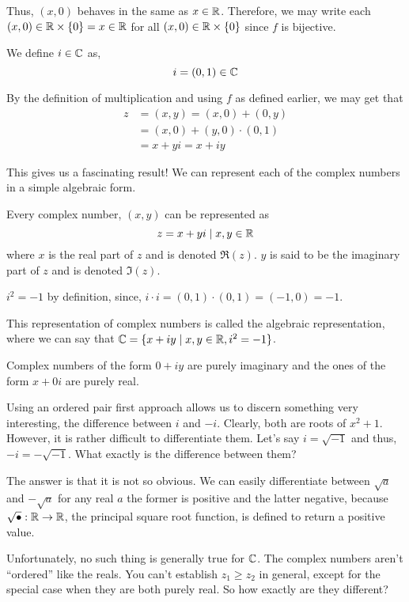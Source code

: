 Thus, \((x, 0)\) behaves in the same as \(x \in \mathbb R\). Therefore, we may write each \((x, 0) \in 
\mathbb R \times \{0\} = x \in \mathbb R\) for all \((x,0) \in \mathbb R \times \left\{0\right\}\) since \(f\) is bijective.

\begin{definition}
    We define \(i \in \mathbb C\) as, 
    \[i = (0, 1) \in \mathbb C\]
\end{definition}

By the definition of multiplication and using \(f\) as defined earlier, we may get that
\begin{align*}
    z &= (x, y) = (x, 0) + (0, y)  \\ 
    &= (x, 0) + (y, 0) \cdot (0,1) \\
    &= x + yi = x + iy
\end{align*}

This gives us a fascinating result! We can represent each of the complex numbers in a simple
algebraic form.

\begin{lemma}
    Every complex number, \((x, y)\) can be represented as 
    \[
        z = x + yi \mid x, y \in \mathbb R\]
    where \(x\) is the real part of \(z\) and is denoted \(\Re(z)\). \(y\) is said
    to be the imaginary part of \(z\) and is denoted \(\Im(z)\).
\end{lemma}

\(i^2 = -1\) by definition, since, \(i \cdot i = (0,1) \cdot (0,1) = (-1,0) = -1\).

This representation of complex numbers is called the algebraic representation, where we can
say that \(\mathbb C = \{x + iy \mid x, y \in \mathbb R, i^2 = -1\}\). 

Complex numbers of the form \(0 + iy\) are purely imaginary and the ones of the form \(x + 0i\)
are purely real. 

Using an ordered pair first approach allows us to discern something very interesting, the difference
between \(i\) and \(-i\). Clearly, both are roots of \(x^2 + 1\). However, it is rather
difficult to differentiate them. Let's say \(i = \sqrt{-1}\) and thus, \(-i = -\sqrt{-1}\).
What exactly is the difference between them?

The answer is that it is not so obvious. We can easily differentiate between 
\(\sqrt{a}\) and \(-\sqrt{a}\) for any real \(a\) the former is positive and the latter
negative, because \(\sqrt{\bullet} : \mathbb R \to \mathbb R \), the principal square root function,
is defined to return a positive value. 

Unfortunately, no such thing is generally true for \(\mathbb C\). The complex
numbers aren't ``ordered'' like the reals. You can't establish \(z_1 \ge z_2\) in general,
except for the special case when they are both purely real. So how exactly are they different?

